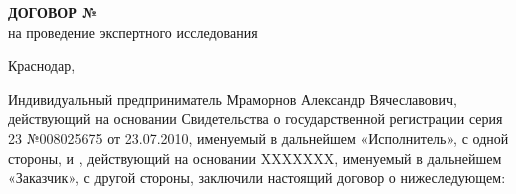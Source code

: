 \documentclass[a4paper,12pt,english,notitlepage]{report}
\begin{document}
	\def\цена{15000}
	\pagestyle{plain}
	
	
	
	\pagestyle{fancy}
	\frenchspacing 
	\fancyhf{}
	\fancyhead{}
	\fancyfoot{} 
	\fancyhead[RE]{ } %
	\fancyhead{}
	\fancyhead[RE]{\small \NomerDoc} %
	
	\fancyfoot[R]{\textcolor{black}{ \textit{{\small }} \rule{3cm}{0.1 mm}}}
	
	\fancyfoot[CE]{\thepage}%
	\fancyfoot[CO]{\thepage}
	
	
	\renewcommand{\headrulewidth}{0 mm}%
	\renewcommand{\headrule}{\hbox to\headwidth{%
			\color{red}\leaders\hrule height \headrulewidth\hfill}}
	
	\renewcommand{\footrulewidth}{0 mm}%
	\futurelet\TMPfootrule\def\footrule{{\color{black}\TMPfootrule}}
	\thispagestyle{empty}  %
	
	

\begin{center}
    	\textbf{{\large  ДОГОВОР № \NomerDoc}}\\
    	 на проведение экспертного исследования
    	 \vspace{-6mm}
    \end{center}
\vspace{-6mm}
\begin{flushright}
		\hfill	Краснодар, \dog    \\[8mm]
\end{flushright} 
\vspace{-6mm}
Индивидуальный предприниматель Мраморнов Александр Вячеславович, действующий на основании Свидетельства о государственной регистрации серия 23 №008025675 от 23.07.2010, именуемый в дальнейшем «Исполнитель», с одной стороны, и , действующий на основании {XXXXXXX}, именуемый в дальнейшем «Заказчик», с другой стороны, заключили настоящий договор о нижеследующем:
\end{document}
